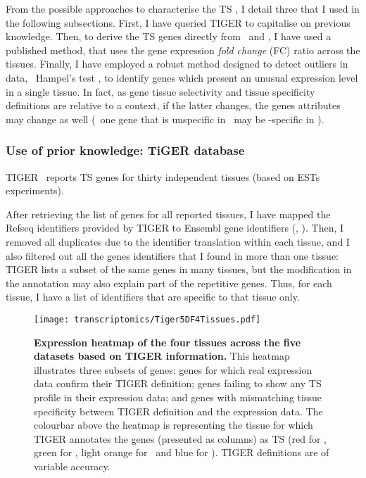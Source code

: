 From the possible approaches to characterise the \gls{TS} \pcgs,
I detail three that I used in the following subsections.
First, I have queried \gls{TIGER} to capitalise on previous knowledge.
Then, to derive the \gls{TS} genes directly from \setOne\ and \setTwo,
I have used a published method,
that uses the gene expression \emph{fold change} (FC) ratio across the tissues.
Finally, I have employed a robust method designed to detect outliers in data,
\ie\ Hampel's test ,
to identify genes which present an unusual expression level in a single tissue.
In fact, as gene tissue selectivity and tissue specificity definitions are
relative to a context,
if the latter changes,
the genes attributes may change as well
(\eg\ one gene that is unspecific in \setTwo\ may be \heart{}-specific in \setOne).\mybr\


\subsubsection{Use of prior knowledge: TiGER database}\label{subsub:Tiger}

\gls{TIGER}~ reports \gls{TS} genes for thirty independent tissues
(based on \glspl{EST} experiments).\mybr\

After retrieving the list of genes for all reported tissues,
I have mapped the \gls{Refseq} identifiers provided by \gls{TIGER}
to \gls{Ensembl} gene identifiers (, ).
Then, I removed all duplicates due to the identifier translation within each tissue,
and I also filtered out all the genes identifiers that
I found in more than one tissue:
\gls{TIGER} lists a subset of the same genes in many tissues,
but the modification in the annotation may also explain part of the
repetitive genes.
Thus, for each tissue,
I have a list of identifiers that are specific to that tissue only.\mybr\

\begin{figure}[!ht]
    \texttt{[image: transcriptomics/Tiger5DF4Tissues.pdf]}\centering
    \vspace{-.15in}
    \caption[Expression heatmap of the four tissues across the five datasets based on
    TiGER]{\label{fig:TigerGenes}\textbf{Expression heatmap of the four tissues
    across the five datasets based on \gls{TIGER} information.}
    This heatmap illustrates three subsets of genes:
    genes for which real expression data confirm their \gls{TIGER} definition;
    genes failing to show any \gls{TS} profile in their expression data; and
    genes with mismatching tissue specificity between \gls{TIGER}
    definition and the expression data.
    The colourbar above the heatmap is representing the tissue
    for which \gls{TIGER} annotates the genes (presented as columns) as \gls{TS}
    (red for \Heart, green for \kidney, light orange for \liver\ and blue for \testis).
    \gls{TIGER} definitions are of variable accuracy.
    }
\end{figure}

